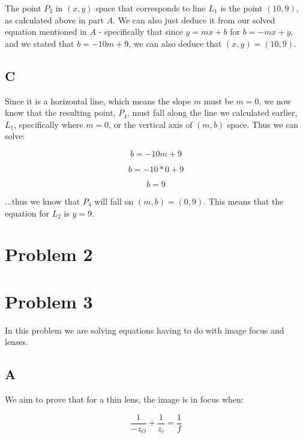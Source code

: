 \documentclass{article}
\begin{document}
The point $P_3$ in $(x,y)$ space that corresponds to line $L_1$ is the point $(10,9)$, as calculated above in part $A$. We can also just deduce it from our solved equation mentioned in $A$ - specifically that since $y=mx+b$ for $b=-mx+y$, and we stated that $b=-10m+9$, we can also deduce that $(x,y)=(10,9)$.

\subsection*{C}

Since it is a horizontal line, which means the slope $m$ must be $m=0$, we now know that the resulting point, $P_4$, must fall along the line we calculated earlier, $L_1$, specifically where $m=0$, or the vertical axis of $(m,b)$ space. Thus we can solve:

\begin{equation}
    b = -10m + 9
\end{equation}

\begin{equation}
    b = -10*0 + 9
\end{equation}

\begin{equation}
    b = 9
\end{equation}

\noindent ...thus we know that $P_4$ will fall on $(m,b)=(0,9)$. This means that the equation for $L_2$ is $y=9$.

\section*{Problem 2}

\section*{Problem 3}

In this problem we are solving equations having to do with image focus and lenses.

\subsection*{A}

We aim to prove that for a thin lens, the image is in focus when:

\begin{equation}
    \frac{1}{-z_O} + \frac{1}{z_c} = \frac{1}{f}
\end{equation}
\end{document}

